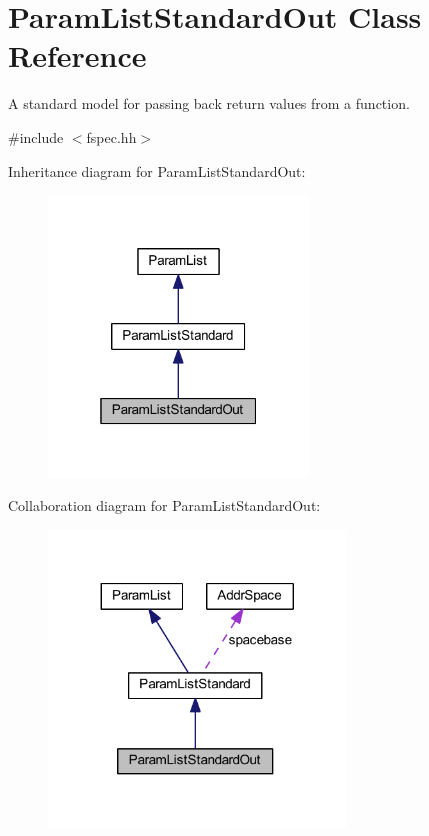\hypertarget{class_param_list_standard_out}{}\section{Param\+List\+Standard\+Out Class Reference}
\label{class_param_list_standard_out}


A standard model for passing back return values from a function.  




{\ttfamily \#include $<$fspec.\+hh$>$}



Inheritance diagram for Param\+List\+Standard\+Out\+:
\nopagebreak
\begin{figure}[H]
\begin{center}
\leavevmode
\includegraphics[width=196pt]{class_param_list_standard_out__inherit__graph}
\end{center}
\end{figure}


Collaboration diagram for Param\+List\+Standard\+Out\+:
\nopagebreak
\begin{figure}[H]
\begin{center}
\leavevmode
\includegraphics[width=224pt]{class_param_list_standard_out__coll__graph}
\end{center}
\end{figure}

